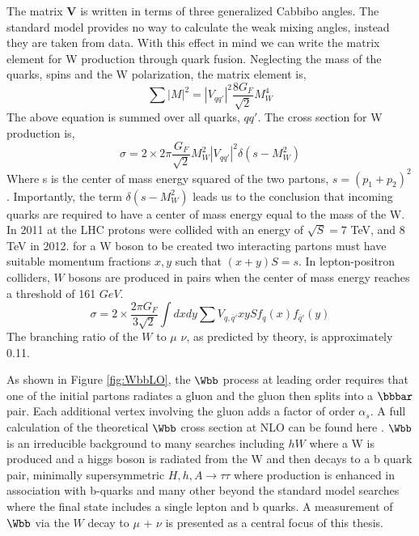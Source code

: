 The matrix {\bf V} is written in terms of three generalized Cabbibo angles.
The standard model provides no way to calculate the weak mixing angles, instead they
are taken from data.
With this effect in mind we can write the matrix element for W production through quark fusion.
Neglecting the mass of the quarks, spins and the W polarization, the matrix element is,
\begin{equation}
\sum|M|^{2}=|V_{qq'}|^{2}\frac{8G_{F}}{\sqrt{2}}M_{W}^{4}
\end{equation}
The above equation is summed over all quarks, $qq'$. The cross section for W production is,
\begin{equation}
\sigma=2\times2\pi\frac{G_{F}}{\sqrt{2}}M_{W}^{2}|V_{qq'}|^{2}\delta(s-M_{W}^{2})
\end{equation}
Where s is the center of mass energy squared of the two partons, $s=(p_{1}+p_{2})^{2}$.
Importantly, the term $\delta(s-M_{W}^{2})$ leads us to the 
conclusion that incoming quarks are required to have a center of mass energy
equal to the mass of the W. 
In 2011 at the LHC protons were collided with an energy of $\sqrt{S}=7$ TeV, and 8 TeV in 2012.
for a W boson to be created two interacting partons must have suitable
momentum fractions $x, y$ such that $(x+y)S=s$.
In lepton-positron colliders, $W$ bosons are produced in pairs when 
the center of mass energy reaches a threshold of 161 $GeV$. 
\begin{equation}
\sigma=2\times\frac{2\pi G_{F}}{3\sqrt{2}}\int{dxdy \sum{V_{q,\bar{q}'}}xyS f_{q}(x)f_{\bar{q}'}(y)}
\end{equation}
The branching ratio of the $W$ to $\mu$ $\nu$, as predicted by theory, is approximately 0.11. 

As shown in Figure \ref{fig:WbbLO}, the $\Wbb$ process at leading order requires that one of the initial partons
radiates a gluon and the gluon then splits into a $\bbbar$ pair. Each additional
vertex involving the gluon adds a factor of order $\alpha_{s}$. A full
calculation of the theoretical $\Wbb$ cross section at NLO can be found here \cite{Campbell:2010ff, Badger:2010mg}.
$\Wbb$ is an irreducible background to many searches including
$hW$ where a W is produced and a higgs boson is radiated from the W
and then decays to a b quark pair, minimally supersymmetric $H,h,A\rightarrow \tau\tau$
where production is enhanced in association with b-quarks and many other beyond the standard
model searches where the final state includes a single lepton and b quarks. 
A measurement of $\Wbb$ via the $W$ decay to $\mu$ + $\nu$ is presented as a 
central focus of this thesis.


